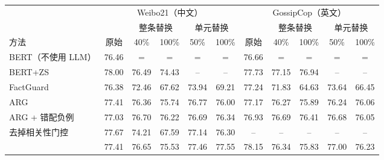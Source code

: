 \begin{tabular}{lcccccccccc}
\toprule
 & \multicolumn{5}{c}{Weibo21（中文）} & \multicolumn{5}{c}{GossipCop（英文）} \\
\cmidrule(lr){2-6}\cmidrule(lr){7-11}
 & & \multicolumn{2}{c}{整条替换} & \multicolumn{2}{c}{单元替换} & & \multicolumn{2}{c}{整条替换} & \multicolumn{2}{c}{单元替换} \\
\cmidrule(lr){3-4}\cmidrule(lr){5-6}\cmidrule(lr){8-9}\cmidrule(lr){10-11}
方法 & 原始 & 40\% & 100\% & 50\% & 100\% & 原始 & 40\% & 100\% & 50\% & 100\% \\
\midrule
BERT（不使用 LLM） & 76.46 & $=$ & $=$ & $=$ & $=$ & 76.66 & $=$ & $=$ & $=$ & $=$ \\
BERT+ZS & 78.00 & 76.49 & 74.43 & -- & -- & 77.73 & 77.15 & 76.94 & -- & -- \\
FactGuard & 76.38 & 72.46 & 67.62 & 73.94 & 69.21 & 77.24 & 71.83 & 64.63 & 73.64 & 66.45 \\
ARG & 77.41 & 76.36 & 75.74 & 76.77 & 76.00 & 77.17 & 76.27 & 75.89 & 76.24 & 76.06 \\
ARG + 错配负例 & 77.03 & 76.70 & 76.22 & 76.69 & 76.34 & 76.93 & 76.69 & 76.41 & 76.68 & 76.05 \\
\method{} 去掉相关性门控 & 77.67 & 74.21 & 67.59 & 77.14 & 76.30 & -- & -- & -- & -- & -- \\
\method{} & 77.41 & 76.65 & 75.53 & 77.46 & 77.55 & 78.15 & 76.34 & 75.83 & 77.00 & 76.23 \\
\bottomrule
\end{tabular}
